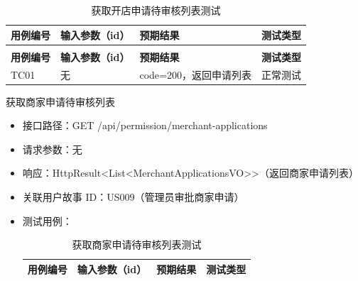 \begin{levellist}
\begin{levellist}
\begin{itemize}
\begin{longtable}{>{\centering\arraybackslash}m{2cm} >{\centering\arraybackslash}m{4cm} >{\centering\arraybackslash}m{5cm} >{\centering\arraybackslash}m{2cm}}
                      \caption{获取开店申请待审核列表测试} \label{tab:training}                        \\

                      \toprule
                      \textbf{用例编号} & \textbf{输入参数（id）} & \textbf{预期结果}   & \textbf{测试类型} \\
                      \midrule
                      \endfirsthead

                      \multicolumn{4}{c}{{\tablename\ \thetable{} 续表}}                    \\
                      \toprule
                      \textbf{用例编号} & \textbf{输入参数（id）} & \textbf{预期结果}   & \textbf{测试类型} \\
                      \midrule
                      \endhead

                      \bottomrule
                      \endfoot


                      TC01          & 无                 & code=200，返回申请列表 & 正常测试          \\
                  \end{longtable}
        \end{itemize}

        \item 获取商家申请待审核列表
        \begin{itemize}
            \item 接口路径：GET /api/permission/merchant-applications
            \item 请求参数：无
            \item 响应：HttpResult<List<MerchantApplicationsVO>>（返回商家申请列表）
            \item 关联用户故事 ID：US009（管理员审批商家申请）
            \item 测试用例：
                  \begin{longtable}{>{\centering\arraybackslash}m{2cm} >{\centering\arraybackslash}m{4cm} >{\centering\arraybackslash}m{5cm} >{\centering\arraybackslash}m{2cm}}

                      \caption{获取商家申请待审核列表测试} \label{tab:training}                        \\

                      \toprule
                      \textbf{用例编号} & \textbf{输入参数（id）} & \textbf{预期结果}   & \textbf{测试类型} \\
                      \midrule
                      \endfirsthead


\end{longtable}
\end{itemize}
\end{levellist}
\end{levellist}
